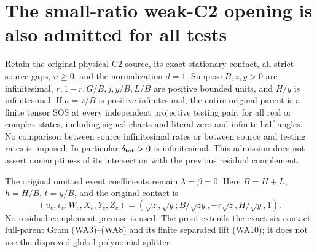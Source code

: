 \section{The small-ratio weak-C2 opening is also admitted for all tests}
\label{sec:r10-weak-boundary}

\begin{theorem}
Retain the original physical C2 source, its exact stationary contact,
all strict source gaps, $n\ge0$, and the normalization $d=1$.
Suppose $B,z,y>0$ are infinitesimal,
$r,1-r,G/B,j,y/B,L/B$ are positive bounded units, and $H/y$ is
infinitesimal. If $a=z/B$ is positive infinitesimal, the entire
original parent is a finite tensor SOS at every independent
projective testing pair, for all real or complex states, including
signed charts and literal zero and infinite half-angles.
No comparison between source infinitesimal rates or between source
and testing rates is imposed. In particular $\delta_{\rm tot}>0$
is infinitesimal. This admission does not assert nonemptiness of
its intersection with the previous residual complement.
\end{theorem}

The original omitted event coefficients remain $\lambda=\beta=0$.
Here $B=H+L$, $h=H/B$, $t=y/B$, and the original contact is
\[
 (u_c,v_c;W_c,X_c,Y_c,Z_c)
 =\left(\sqrt z,\sqrt y;B/\sqrt{zy},-r\sqrt z,H/\sqrt y,1\right).
\]
No residual-complement premise is used. The proof extends the exact
six-contact full-parent Gram (WA3)--(WA8) and its finite separated
lift (WA10); it does not use the disproved global polynomial splitter.

